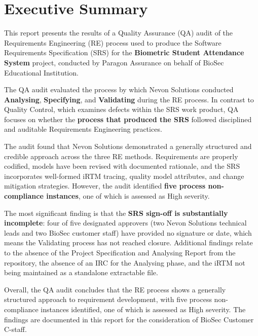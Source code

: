 \documentclass[11pt,a4paper]{article}
\begin{document}
\bigskip


\section{Executive Summary}

This report presents the results of a Quality Assurance (QA) audit of the Requirements Engineering (RE) process used to produce the Software Requirements Specification (SRS) for the \textbf{Biometric Student Attendance System} project, conducted by Paragon Assurance on behalf of BioSec Educational Institution.

The QA audit evaluated the process by which Nevon Solutions conducted \textbf{Analysing}, \textbf{Specifying}, and \textbf{Validating} during the RE process. In contrast to Quality Control, which examines defects within the SRS work product, QA focuses on whether the \textbf{process that produced the SRS} followed disciplined and auditable Requirements Engineering practices.

The audit found that Nevon Solutions demonstrated a generally structured and credible approach across the three RE methods. Requirements are properly codified, models have been revised with documented rationale, and the SRS incorporates well-formed iRTM tracing, quality model attributes, and change mitigation strategies. However, the audit identified \textbf{five process non-compliance instances}, one of which is assessed as High severity.

The most significant finding is that the \textbf{SRS sign-off is substantially incomplete}: four of five designated approvers (two Nevon Solutions technical leads and two BioSec customer staff) have provided no signature or date, which means the Validating process has not reached closure. Additional findings relate to the absence of the Project Specification and Analysing Report from the repository, the absence of an IRC for the Analysing phase, and the iRTM not being maintained as a standalone extractable file.

Overall, the QA audit concludes that the RE process shows a generally structured approach to requirement development, with five process non-compliance instances identified, one of which is assessed as High severity. The findings are documented in this report for the consideration of BioSec Customer C-staff.

\end{document}
